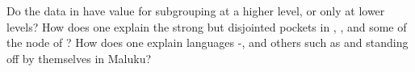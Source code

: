 Do the data in  have value for subgrouping at a higher
level, or only at lower levels? How does one explain the strong but
disjointed pockets in ,
, and some of the  node of ? How does one explain 
languages -, and others such as 
and  standing off by themselves in Maluku?